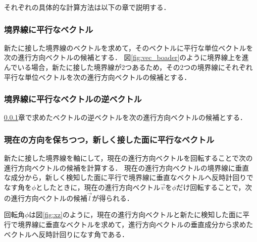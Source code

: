 \documentclass[a4paper,11pt]{jarticle}
\begin{document}
	それぞれの具体的な計算方法は以下の章で説明する．
	\subsubsection{境界線に平行なベクトル}
	\label{boader}
	新たに接した境界線のベクトルを求めて，そのベクトルに平行な単位ベクトルを次の進行方向ベクトルの候補とする．
	図\ref{fig:vec_boader}のように境界線上を進んでいる場合，新たに接した境界線が2つあるため，その2つの境界線にそれぞれ平行な単位ベクトルを次の進行方向ベクトルの候補とする．
	
	\subsubsection{境界線に平行なベクトルの逆ベクトル}
	\ref{boader}章で求めたベクトルの逆ベクトルを次の進行方向ベクトルの候補とする．
	
	\subsubsection{現在の方向を保ちつつ，新しく接した面に平行なベクトル}
	\label{rotation}
	新たに接した境界線を軸にして，現在の進行方向ベクトルを回転することで次の進行方向ベクトルの候補を計算する．
	現在の進行方向ベクトルの境界線に垂直な成分から，新しく検知した面に平行で境界線に垂直なベクトルへ反時計回りでなす角を$ \phi $としたときに，現在の進行方向ベクトル$\vec{v}$を$\phi$だけ回転することで，次の進行方向ベクトルの候補$\vec{l}$が得られる．
	
	回転角$\phi$は図\ref{fig:xz}のように，現在の進行方向ベクトルと新たに検知した面に平行で境界線に垂直なベクトルを求めて，進行方向ベクトルの垂直成分から求めたベクトルへ反時計回りになす角である．
	
\end{document}

